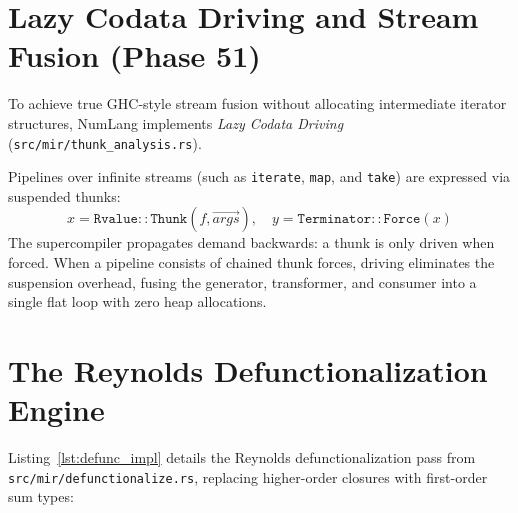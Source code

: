 \section{Lazy Codata Driving and Stream Fusion (Phase 51)}
\label{sec:higher_order:codata}

To achieve true GHC-style stream fusion without allocating intermediate iterator structures, NumLang implements \emph{Lazy Codata Driving} (\texttt{src/mir/thunk\_analysis.rs}).

Pipelines over infinite streams (such as \texttt{iterate}, \texttt{map}, and \texttt{take}) are expressed via suspended thunks:
\begin{equation}
x = \mathtt{Rvalue::Thunk}(f, \vec{args}), \quad y = \mathtt{Terminator::Force}(x)
\end{equation}
The supercompiler propagates demand backwards: a thunk is only driven when forced. When a pipeline consists of chained thunk forces, driving eliminates the suspension overhead, fusing the generator, transformer, and consumer into a single flat loop with zero heap allocations.

\section{The Reynolds Defunctionalization Engine}
\label{sec:higher_order:defunc_impl}

Listing~\ref{lst:defunc_impl} details the Reynolds defunctionalization pass from \texttt{src/mir/defunctionalize.rs}, replacing higher-order closures with first-order sum types:

